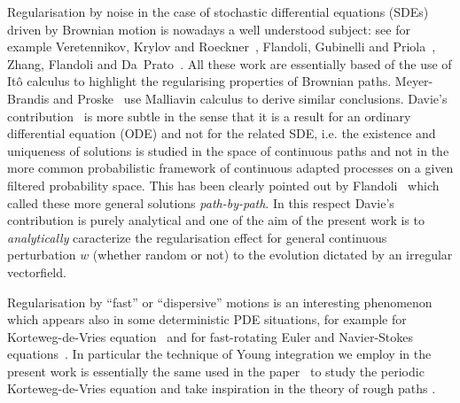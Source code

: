 \documentclass[a4paper,11pt]{article}
\newcommand{\tmem}[1]{{\em #1\/}}
\begin{document}
Regularisation by noise in the case of stochastic differential equations
(SDEs) driven by Brownian motion is nowadays a well understood subject: see
for example Veretennikov, Krylov and Roeckner~{\cite{MR2117951}}, Flandoli,
Gubinelli and Priola~{\cite{FGP}}, Zhang, Flandoli and Da~Prato~{\cite{DF}}.
All these work are essentially based of the use of Itô calculus to highlight
the regularising properties of Brownian paths. Meyer-Brandis and
Proske~{\cite{MR2606880}} use Malliavin calculus to derive similar
conclusions. Davie's contribution~{\cite{MR2377011}} is more subtle in the
sense that it is a result for an ordinary differential equation (ODE) and not
for the related SDE, i.e. the existence and uniqueness of solutions is studied
in the space of continuous paths and not in the more common probabilistic
framework of continuous adapted processes on a given filtered probability
space. This has been clearly pointed out by
Flandoli~{\cite{flandoli_random_2011}} which called these more general
solutions {\tmem{path-by-path}}. In this respect Davie's contribution is
purely analytical and one of the aim of the present work is to
{\tmem{analytically}} caracterize the regularisation effect for general
continuous perturbation $w$ (whether random or not) to the evolution dictated
by an irregular vectorfield.



Regularisation by ``fast'' or ``dispersive'' motions is an interesting
phenomenon which appears also in some deterministic PDE situations, for
example for Korteweg-de-Vries equation~{\cite{kdv,BIT}} and for fast-rotating
Euler and Navier-Stokes equations~{\cite{BMN}}. In particular the technique of
Young integration we employ in the present work is essentially the same used
in the paper~{\cite{kdv}} to study the periodic Korteweg-de-Vries equation and
take inspiration in the theory of rough paths {\cite{Lyons,controlling,FV}}.
\end{document}

